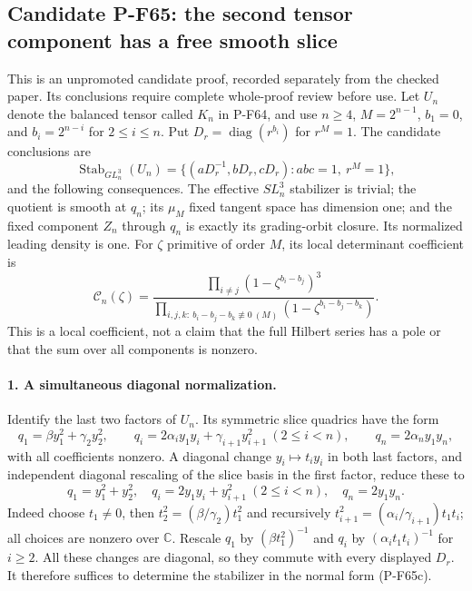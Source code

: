 \subsection{Candidate P-F65: the second tensor component has a free smooth slice}

This is an unpromoted candidate proof, recorded separately from the checked
paper.  Its conclusions require complete whole-proof review before use.
Let $U_n$ denote the balanced tensor called $K_n$ in P-F64, and use
$n\ge4$, $M=2^{n-1}$, $b_1=0$, and $b_i=2^{n-i}$ for $2\le i\le n$.
Put $D_r=\operatorname{diag}(r^{b_i})$ for $r^M=1$.
The candidate conclusions are
\[
 \operatorname{Stab}_{GL_n^3}(U_n)
 =\{(aD_r^{-1},bD_r,cD_r):abc=1,\ r^M=1\},             \tag{P-F65a}
\]
and the following consequences.  The effective $SL_n^3$ stabilizer is
trivial; the quotient is smooth at $q_n$; its $\mu_M$ fixed tangent
space has dimension one; and the fixed component $Z_n$ through $q_n$
is exactly its grading-orbit closure.  Its normalized leading density
is one.  For $\zeta$ primitive of order $M$, its local determinant
coefficient is
\[
 \mathcal C_n(\zeta)=
 \frac{\displaystyle\prod_{i\ne j}(1-\zeta^{b_i-b_j})^3}
 {\displaystyle\prod_{i,j,k:\ b_i-b_j-b_k\not\equiv0\ (M)}
                  (1-\zeta^{b_i-b_j-b_k})}.             \tag{P-F65b}
\]
This is a local coefficient, not a claim that the full Hilbert series
has a pole or that the sum over all components is nonzero.

\paragraph{1. A simultaneous diagonal normalization.}
Identify the last two factors of $U_n$.  Its symmetric slice quadrics
have the form
\[
 q_1=\beta y_1^2+\gamma_2y_2^2,\qquad
 q_i=2\alpha_i y_1y_i+\gamma_{i+1}y_{i+1}^2\ (2\le i<n),
 \qquad q_n=2\alpha_n y_1y_n,
\]
with all coefficients nonzero.  A diagonal change $y_i\mapsto t_i y_i$
in both last factors, and independent diagonal rescaling of the slice
basis in the first factor, reduce these to
\[
 q_1=y_1^2+y_2^2,\quad
 q_i=2y_1y_i+y_{i+1}^2\ (2\le i<n),\quad q_n=2y_1y_n. \tag{P-F65c}
\]
Indeed choose $t_1\ne0$, then
$t_2^2=(\beta/\gamma_2)t_1^2$ and recursively
$t_{i+1}^2=(\alpha_i/\gamma_{i+1})t_1t_i$; all choices are nonzero
over $\mathbb C$.  Rescale $q_1$ by $(\beta t_1^2)^{-1}$ and
$q_i$ by $(\alpha_i t_1t_i)^{-1}$ for $i\ge2$.
All these changes are diagonal, so they commute with every displayed
$D_r$.  It therefore suffices to determine the stabilizer in the
normal form (P-F65c).

